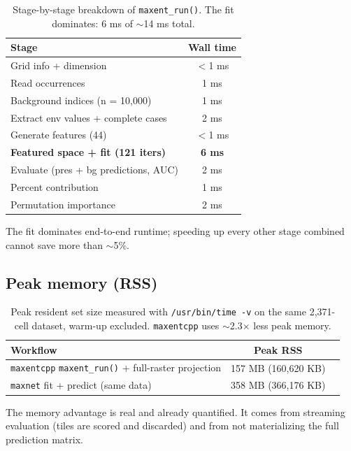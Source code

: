 \begin{table}[h]
\centering
\small
\begin{tabular}{lc}
\toprule
\textbf{Stage} & \textbf{Wall time} \\
\midrule
Grid info + dimension & $<$1 ms \\
Read occurrences & 1 ms \\
Background indices (n = 10,000) & 1 ms \\
Extract env values + complete cases & 2 ms \\
Generate features (44) & $<$1 ms \\
\textbf{Featured space + fit (121 iters)} & \textbf{6 ms} \\
Evaluate (pres + bg predictions, AUC) & 2 ms \\
Percent contribution & 1 ms \\
Permutation importance & 2 ms \\
\bottomrule
\end{tabular}
\caption{Stage-by-stage breakdown of \texttt{maxent\_run()}.  The fit
dominates: 6 ms of $\sim$14 ms total.}
\label{tab:breakdown}
\end{table}

The fit dominates end-to-end runtime; speeding up every other stage
combined cannot save more than $\sim$5\%.

\subsection{Peak memory (RSS)}

\begin{table}[h]
\centering
\small
\begin{tabular}{lcc}
\toprule
\textbf{Workflow} & \textbf{Peak RSS} \\
\midrule
\texttt{maxentcpp} \texttt{maxent\_run()} + full-raster projection & 157 MB (160,620 KB) \\
\texttt{maxnet} fit + predict (same data) & 358 MB (366,176 KB) \\
\bottomrule
\end{tabular}
\caption{Peak resident set size measured with \texttt{/usr/bin/time -v}
on the same 2,371-cell dataset, warm-up excluded.  \texttt{maxentcpp}
uses $\sim$2.3$\times$ less peak memory.}
\label{tab:mem}
\end{table}

The memory advantage is real and already quantified.  It comes from
streaming evaluation (tiles are scored and discarded) and from not
materializing the full prediction matrix.

